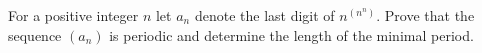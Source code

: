 For a positive integer $n$ let $a_n$ denote the last digit of $n^{(n^n)}$. Prove that the sequence $(a_n)$ is periodic and determine the length of the minimal period.